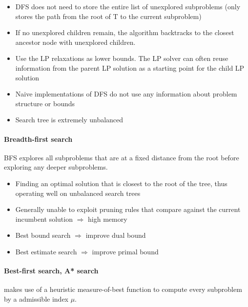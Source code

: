                     \begin{itemize}
                        \item DFS does not need to store the entire list of unexplored subproblems (only stores the path from the root of T to the current subproblem)
                        \item If no unexplored children remain, the algorithm backtracks to the closest ancestor node with unexplored children.
                        \item Use the LP relaxations as lower bounds. The LP solver can often reuse information from the parent LP solution as a starting point for the child LP solution
                        \item Naive implementations of DFS do not use any information about problem structure or bounds
                        \item Search tree is extremely unbalanced
                    \end{itemize}

                \paragraph{Breadth-first search}
                    BFS explores all subproblems that are at a fixed distance from the root before exploring any deeper subproblems.

                    \begin{itemize}
                        \item Finding an optimal solution that is closest to the root of the tree, thus operating well on unbalanced search trees
                        \item Generally unable to exploit pruning rules that compare against the current incumbent solution $\Rightarrow$ high memory
                        \item Best bound search $\Rightarrow$ improve dual bound
                        \item Best estimate search $\Rightarrow$ improve primal bound
                    \end{itemize}

                \paragraph{Best-first search, A* search}
                    makes use of a heuristic measure-of-best function to compute every subproblem by a admissible index $\mu$.

